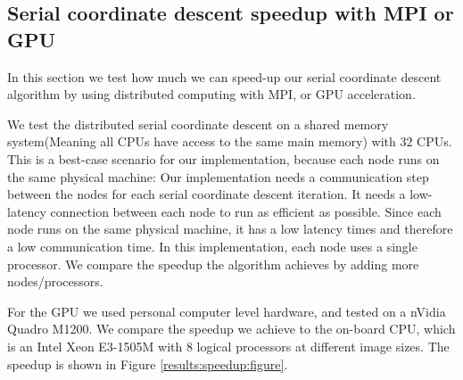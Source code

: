 


\subsection{Serial coordinate descent speedup with MPI or GPU}\label{results:speedup}
In this section we test how much we can speed-up our serial coordinate descent algorithm by using distributed computing with MPI, or GPU acceleration.

We test the distributed serial coordinate descent on a shared memory system(Meaning all CPUs have access to the same main memory) with 32 CPUs. This is a best-case scenario for our implementation, because each node runs on the same physical machine: Our implementation needs a communication step between the nodes for each serial coordinate descent iteration. It needs a low-latency connection between each node to run as efficient as possible. Since each node runs on the same physical machine, it has a low latency times and therefore a low communication time. In this implementation, each node uses a single processor. We compare the speedup the algorithm achieves by adding more nodes/processors.

For the GPU we used personal computer level hardware, and tested on a nVidia Quadro M1200. We compare the speedup we achieve to the on-board CPU, which is an Intel Xeon E3-1505M with 8 logical processors at different image sizes. The speedup is shown in Figure \ref{results:speedup:figure}.

